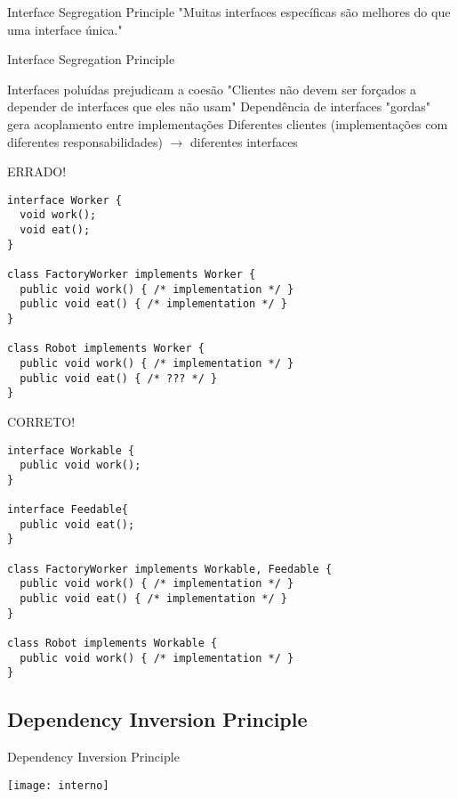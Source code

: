 \documentclass{beamer}
\begin{document}
\begin{frame}{Interface Segregation Principle}
 "Muitas interfaces específicas são melhores do que uma interface única."
\end{frame}

\begin{frame}{Interface Segregation Principle}
 \begin{outline}
   Interfaces poluídas prejudicam a coesão
   "Clientes não devem ser forçados a depender de interfaces que eles não usam"
     Dependência de interfaces "gordas" gera acoplamento entre implementações
   Diferentes clientes (implementações com diferentes responsabilidades) $\rightarrow$ diferentes interfaces
 \end{outline}
\end{frame}

\begin{frame}[fragile]{ERRADO!}
 \begin{verbatim}
interface Worker {
  void work();
  void eat();
}

class FactoryWorker implements Worker {
  public void work() { /* implementation */ }
  public void eat() { /* implementation */ }
}

class Robot implements Worker {
  public void work() { /* implementation */ }
  public void eat() { /* ??? */ }
}
  \end{verbatim}
\end{frame}

\begin{frame}[fragile]{CORRETO!}
 \begin{verbatim}
interface Workable {
  public void work();
}

interface Feedable{
  public void eat();
}

class FactoryWorker implements Workable, Feedable {
  public void work() { /* implementation */ }
  public void eat() { /* implementation */ }
}

class Robot implements Workable {
  public void work() { /* implementation */ }
}
  \end{verbatim}
\end{frame}

\subsection{Dependency Inversion Principle}

\begin{frame}{Dependency Inversion Principle}
  \begin{center}
    \texttt{[image: interno]}
  \end{center}
\end{frame}
\end{document}

